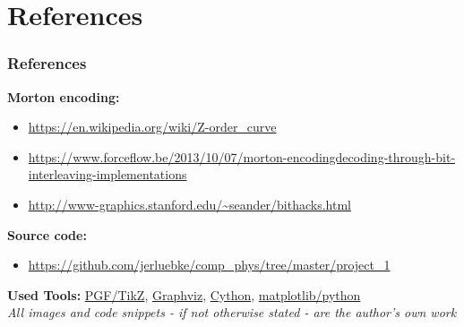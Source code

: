 \section{References}
\begin{frame}
    \frametitle{References}
    \textbf{Morton encoding:}
    \begin{itemize}
    \item \url{https://en.wikipedia.org/wiki/Z-order_curve} \\
    \item
        \url{https://www.forceflow.be/2013/10/07/morton-encodingdecoding-through-bit-interleaving-implementations}
        \\
    \item \url{http://www-graphics.stanford.edu/~seander/bithacks.html}
    \end{itemize}
    \textbf{Source code:}
    \begin{itemize}
        \item \url{https://github.com/jerluebke/comp_phys/tree/master/project_1}
    \end{itemize}
    \textbf{Used Tools:}
    \href{https://sourceforge.net/projects/pgf/}{PGF/TikZ},
    \href{https://graphviz.gitlab.io/}{Graphviz},
    \href{https://cython.org/}{Cython},
    \href{https://matplotlib.org/}{matplotlib/python}
    \vspace*{\baselineskip} \\
    {\footnotesize\textit{All images and code snippets - if not otherwise stated - are
    the author's own work}}
\end{frame}

